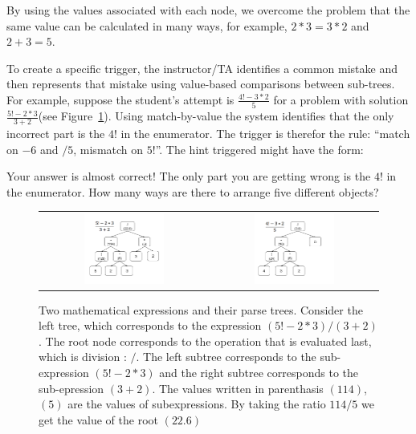 \documentclass{llncs2e/llncs}
\begin{document}
By using the values associated with each node, we overcome the problem that the same value can be calculated in many ways, for example, $2*3 = 3*2$ and $2+3=5$. 

To create a specific trigger, the instructor/TA identifies a common
mistake and then represents that mistake using value-based comparisons between sub-trees. For example,
suppose the student's attempt is $\frac{4!-3*2}{5}$
for a problem with solution $\frac{5!-2*3}{3+2}$(see Figure~\ref{fig:parse_tree}). Using match-by-value the system identifies that the only incorrect part is the $4!$ in the enumerator. The trigger is therefor the rule: ``match on $-6$ and $/5$, mismatch on $5!$''. The hint triggered might have the form:
\begin{displayquote}
Your answer is almost correct! The only part you are getting wrong is
the $4!$ in the enumerator. How many ways are there to arrange five different objects?
\end{displayquote}


\begin{figure}[ht]
  \centering
   \begin{tabular}{c c}
		\includegraphics[width=0.5\textwidth]{image/ParseTrees1.png} &
		\includegraphics[width=0.5\textwidth]{image/ParseTrees2.png}
	\end{tabular}
   \caption{Two mathematical expressions and their parse
     trees. Consider the left tree, which corresponds to the
     expression $(5!-2*3)/(3+2)$. The root node corresponds to the
     operation that is evaluated last, which is division : $/$. The
     left subtree corresponds to the sub-expression $(5!-2*3)$ and the
     right subtree corresponds to the sub-epression $(3+2)$. The
     values written in parenthasis $(114)$,$(5)$ are the values of
     subexpressions. By taking the ratio $114/5$ we get the value of
     the root $(22.6)$}
   \label{fig:parse_tree}
\end{figure}
\end{document}
